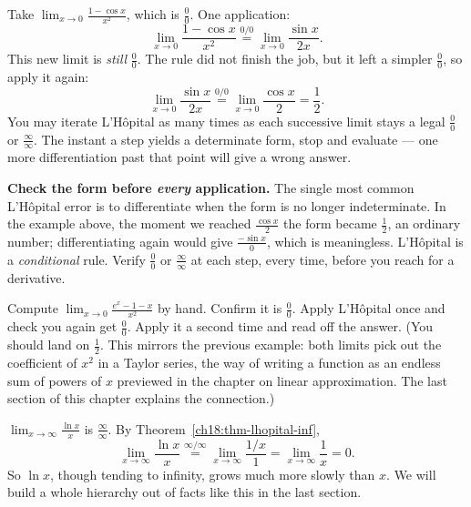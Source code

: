 \begin{example}\label{ch18:ex-twice}
Take $\displaystyle\lim_{x\to 0}\frac{1-\cos x}{x^2}$, which is $\tfrac{0}{0}$. One
application:
\[
\lim_{x\to 0}\frac{1-\cos x}{x^2}\overset{0/0}{=}\lim_{x\to 0}\frac{\sin x}{2x}.
\]
This new limit is \emph{still} $\tfrac{0}{0}$. The rule did not finish the job, but
it left a simpler $\tfrac00$, so apply it again:
\[
\lim_{x\to 0}\frac{\sin x}{2x}\overset{0/0}{=}\lim_{x\to 0}\frac{\cos x}{2}
=\frac{1}{2}.
\]
You may iterate L'H\^opital as many times as each successive limit stays a legal
$\tfrac00$ or $\tfrac{\infty}{\infty}$. The instant a step yields a determinate form,
stop and evaluate --- one more differentiation past that point will give a wrong
answer.
\end{example}

\begin{trapbox}
\textbf{Check the form before \emph{every} application.} The single most common
L'H\^opital error is to differentiate when the form is no longer indeterminate. In the
example above, the moment we reached $\tfrac{\cos x}{2}$ the form became
$\tfrac{1}{2}$, an ordinary number; differentiating again would give
$\tfrac{-\sin x}{0}$, which is meaningless. L'H\^opital is a \emph{conditional} rule. Verify
$\tfrac00$ or $\tfrac{\infty}{\infty}$ at each step, every time, before you reach for a
derivative.
\end{trapbox}

\begin{labbox}
Compute $\displaystyle\lim_{x\to 0}\frac{e^x-1-x}{x^2}$ by hand. Confirm it is
$\tfrac00$. Apply L'H\^opital once and check you again get $\tfrac00$. Apply it a second
time and read off the answer. (You should land on $\tfrac12$. This mirrors
the previous example: both limits pick out the coefficient of $x^2$ in a
Taylor series, the way of writing a function as an endless sum of powers of $x$
previewed in the chapter on linear approximation. The last section of this chapter
explains the connection.)
\end{labbox}

\begin{example}\label{ch18:ex-lnx}
$\displaystyle\lim_{x\to\infty}\frac{\ln x}{x}$ is $\tfrac{\infty}{\infty}$. By
Theorem~\ref{ch18:thm-lhopital-inf},
\[
\lim_{x\to\infty}\frac{\ln x}{x}\overset{\infty/\infty}{=}
\lim_{x\to\infty}\frac{1/x}{1}=\lim_{x\to\infty}\frac{1}{x}=0.
\]
So $\ln x$, though tending to infinity, grows much more slowly than $x$. We will
build a whole hierarchy out of facts like this in the last section.
\end{example}

